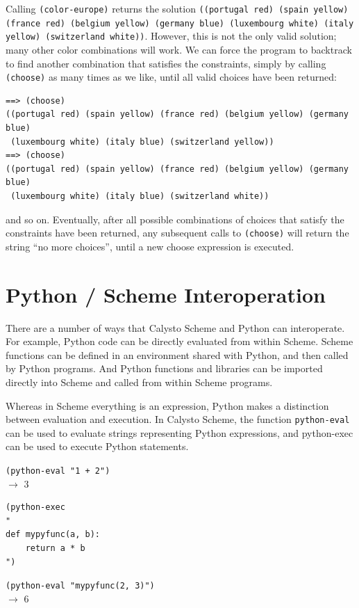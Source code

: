 \documentclass[acmsmall,screen,authorversion]{acmart}
\begin{document}
\noindent
Calling \texttt{(color-europe)} returns the solution \texttt{((portugal red)
  (spain yellow) (france red) (belgium yellow) (germany blue) (luxembourg
  white) (italy yellow) (switzerland white))}. However, this is not the only
valid solution; many other color combinations will work.  We can force the
program to backtrack to find another combination that satisfies the
constraints, simply by calling \texttt{(choose)} as many times as we like,
until all valid choices have been returned:

{\footnotesize
\begin{verbatim}
==> (choose)
((portugal red) (spain yellow) (france red) (belgium yellow) (germany blue)
 (luxembourg white) (italy blue) (switzerland yellow))
==> (choose)
((portugal red) (spain yellow) (france red) (belgium yellow) (germany blue)
 (luxembourg white) (italy blue) (switzerland white))
\end{verbatim}}

\noindent
and so on.  Eventually, after all possible combinations of choices that satisfy
the constraints have been returned, any subsequent calls to \texttt{(choose)}
will return the string ``no more choices'', until a new choose expression is
executed.

\section{Python / Scheme Interoperation}

There are a number of ways that Calysto Scheme and Python can interoperate. For
example, Python code can be directly evaluated from within Scheme. Scheme
functions can be defined in an environment shared with Python, and then called
by Python programs. And Python functions and libraries can be imported directly
into Scheme and called from within Scheme programs.

Whereas in Scheme everything is an expression, Python makes a distinction
between evaluation and execution. In Calysto Scheme, the function
\texttt{python-eval} can be used to evaluate strings representing Python
expressions, and python-exec can be used to execute Python statements.\\

{\footnotesize
\noindent
\texttt{(python-eval "1 + 2")}\\
$\rightarrow$ 3

\noindent
\begin{verbatim}
(python-exec
"
def mypyfunc(a, b):
    return a * b
")
\end{verbatim}
\noindent\texttt{(python-eval "mypyfunc(2, 3)")}\\
$\rightarrow$ 6\\
}
\end{document}

